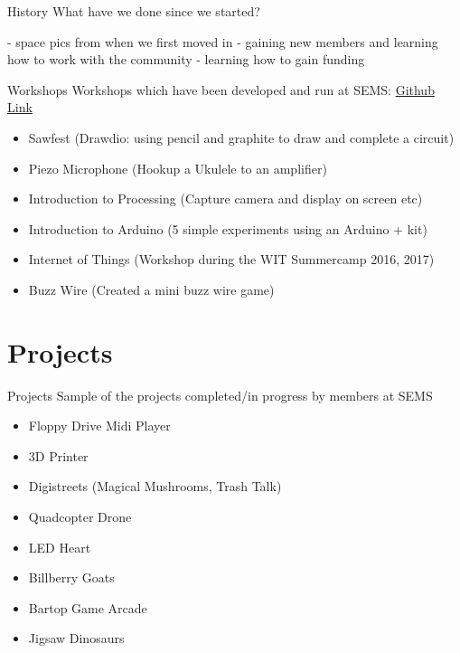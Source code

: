 \documentclass{beamer}
\begin{document}
\begin{frame}{History}
What have we done since we started?

- space pics from when we first moved in
- gaining new members and learning how to work with the community
- learning how to gain funding

\end{frame}


\begin{frame}{Workshops}
Workshops which have been developed and run at SEMS: \href{https://github.com/semkr/workshops}{Github Link}
\begin{itemize}
	\item Sawfest (Drawdio: using pencil and graphite to draw and complete a circuit)
	\item Piezo Microphone (Hookup a Ukulele to an amplifier)
	\item Introduction to Processing (Capture camera and display on screen etc)
	\item Introduction to Arduino (5 simple experiments using an Arduino + kit)
	\item Internet of Things (Workshop during the WIT Summercamp 2016, 2017)
	\item Buzz Wire (Created a mini buzz wire game)
\end{itemize}
\end{frame}


\section{Projects}
\begin{frame}{Projects}
Sample of the projects completed/in progress by members at SEMS
\begin{itemize}
	\item Floppy Drive Midi Player
	\item 3D Printer
	\item Digistreets (Magical Mushrooms, Trash Talk)
	\item Quadcopter Drone
	\item LED Heart
	\item Billberry Goats	
	\item Bartop Game Arcade
	\item Jigsaw Dinosaurs
\end{itemize}
\end{frame}
\end{document}
